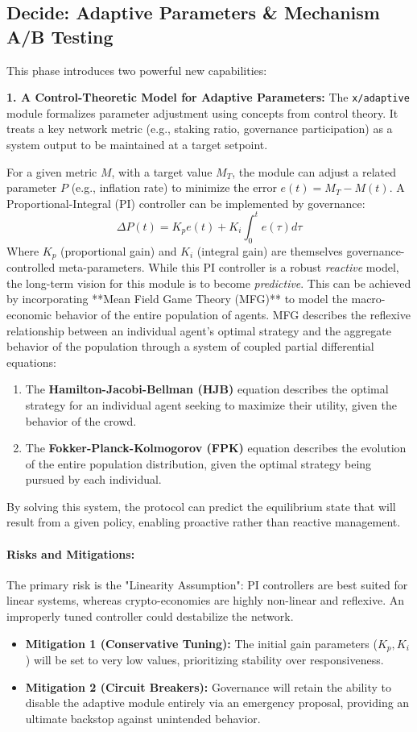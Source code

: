 \documentclass[10pt]{article}
\begin{document}
\subsection{Decide: Adaptive Parameters \& Mechanism A/B Testing}
This phase introduces two powerful new capabilities:

\textbf{1. A Control-Theoretic Model for Adaptive Parameters:} The \texttt{x/adaptive} module formalizes parameter adjustment using concepts from control theory. It treats a key network metric (e.g., staking ratio, governance participation) as a system output to be maintained at a target setpoint.

For a given metric \(M\), with a target value \(M_T\), the module can adjust a related parameter \(P\) (e.g., inflation rate) to minimize the error \(e(t) = M_T - M(t)\). A Proportional-Integral (PI) controller can be implemented by governance:
\[ \Delta P(t) = K_p e(t) + K_i \int_{0}^{t} e(\tau) d\tau \]
Where \(K_p\) (proportional gain) and \(K_i\) (integral gain) are themselves governance-controlled meta-parameters. While this PI controller is a robust \textit{reactive} model, the long-term vision for this module is to become \textit{predictive}. This can be achieved by incorporating **Mean Field Game Theory (MFG)** to model the macro-economic behavior of the entire population of agents. MFG describes the reflexive relationship between an individual agent's optimal strategy and the aggregate behavior of the population through a system of coupled partial differential equations:
\begin{enumerate}
    \item The \textbf{Hamilton-Jacobi-Bellman (HJB)} equation describes the optimal strategy for an individual agent seeking to maximize their utility, given the behavior of the crowd.
    \item The \textbf{Fokker-Planck-Kolmogorov (FPK)} equation describes the evolution of the entire population distribution, given the optimal strategy being pursued by each individual.
\end{enumerate}
By solving this system, the protocol can predict the equilibrium state that will result from a given policy, enabling proactive rather than reactive management.

\paragraph{Risks and Mitigations:} The primary risk is the "Linearity Assumption": PI controllers are best suited for linear systems, whereas crypto-economies are highly non-linear and reflexive. An improperly tuned controller could destabilize the network.
\begin{itemize}[leftmargin=*, itemsep=2pt]
    \item \textbf{Mitigation 1 (Conservative Tuning):} The initial gain parameters (\(K_p, K_i\)) will be set to very low values, prioritizing stability over responsiveness.
    \item \textbf{Mitigation 2 (Circuit Breakers):} Governance will retain the ability to disable the adaptive module entirely via an emergency proposal, providing an ultimate backstop against unintended behavior.
\end{itemize}
\end{document}
